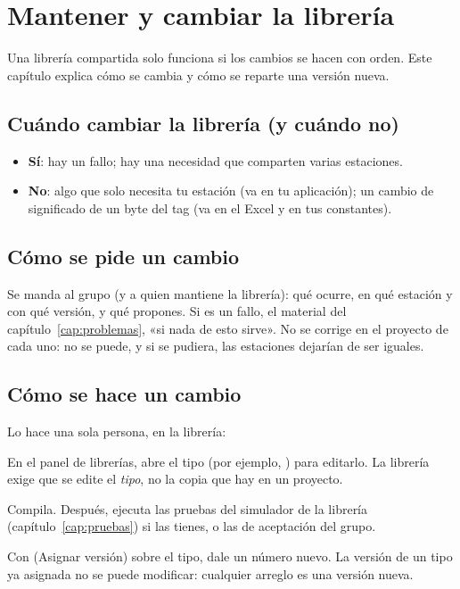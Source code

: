 \chapter{Mantener y cambiar la librería}\label{cap:mantenimiento}

Una librería compartida solo funciona si los cambios se hacen con orden. Este capítulo explica cómo se cambia y cómo se reparte una versión nueva.

\section{Cuándo cambiar la librería (y cuándo no)}
\begin{itemize}
\item \textbf{Sí}: hay un fallo; hay una necesidad que comparten varias estaciones.
\item \textbf{No}: algo que solo necesita tu estación (va en tu aplicación); un cambio de significado de un byte del tag (va en el Excel y en tus constantes).
\end{itemize}

\section{Cómo se pide un cambio}
Se manda al grupo (y a quien mantiene la librería): qué ocurre, en qué estación y con qué versión, y qué propones. Si es un fallo, el material del capítulo~\ref{cap:problemas}, «si nada de esto sirve». No se corrige en el proyecto de cada uno: no se puede, y si se pudiera, las estaciones dejarían de ser iguales.

\section{Cómo se hace un cambio}
Lo hace una sola persona, en la librería:

\reiniciapaso
{}
En el panel de librerías, abre el tipo (por ejemplo, ) para editarlo. La librería exige que se edite el \emph{tipo}, no la copia que hay en un proyecto.

Compila. Después, ejecuta las pruebas del simulador de la librería (capítulo~\ref{cap:pruebas}) si las tienes, o las de aceptación del grupo.

Con  (Asignar versión) sobre el tipo, dale un número nuevo. La versión de un tipo ya asignada no se puede modificar: cualquier arreglo es una versión nueva.

